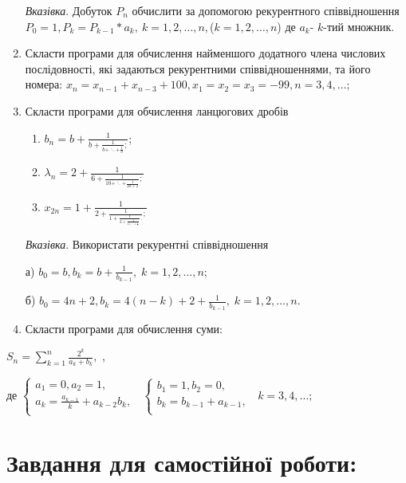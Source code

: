 \documentclass[a5paper,titlepage,openany,twoside,
]
{book_unv}%
\makeatletter
\newcommand{\xslalph}[1]{\expandafter\@xslalph\csname c@#1\endcsname}
\newcommand{\@xslalph}[1]{%
    \ifcase#1\or а\or б\or в\or г\or д\or e\or є\or ж\or з\or i%
    \or й\or к\or л\or м\or н\or о\or п\or р\or с\or т%
    \or у\or ф\or х\or ц\or ч\or ш\or ю\or я\or аа\or бб\or вв%
    \else\@ctrerr\fi%
}
\makeatother
\begin{document}
\begin{enumerate}
\emph{\emph{Вказівка}}. Добуток $P_{n}$ обчислити за
допомогою рекурентного співвідношення
\(P_{0} = 1,P_{k} = P_{k - 1}*a_{k},\ k = 1,2,\ldots,n,\)($k=1,2,\ldots,n$)
де \(a_{k}\)- $k$-тий множник.

\item
  Скласти програми для обчислення найменшого додатного члена числових
  послідовності, які задаються рекурентними співвідношеннями, та його
  номера:
\(x_{n} = x_{n - 1} + x_{n - 3} + 100, x_{1} = x_{2} = x_{3} = - 99, n = 3,4,\ldots;\)

\item
  Скласти програми для обчислення ланцюгових дробів
\begin{enumerate}[label=\xslalph*)]
\item \(b_{n} = b + \frac{1}{b + \frac{1}{b + \ddots + \frac{1}{b}};}\); 
\item
\(\lambda_{n} = 2 + \frac{1}{6 + \frac{1}{10 + \ddots + \frac{1}{4n + 2}};}\)
\item
\(x_{2n} = 1 + \frac{1}{2 + \frac{1}{1 + \frac{1}{2 + \frac{1}{1 + \ddots + \frac{1}{2}}}.};}\)
\end{enumerate}
\emph{\emph{Вказівка}}. Використати рекурентні співвідношення

а)
\(b_{0} = b,b_{k} = b + \frac{1}{b_{k - 1}}, \; k = 1,2,\ldots,n\);

б)
\(b_{0} = 4n + 2,b_{k} = 4(n - k) + 2 + \frac{1}{b_{k - 1}},\; k = 1,2,\ldots,n\).

\item
  Скласти програми для обчислення суми:
\end{enumerate}

\(S_{n} = \sum\limits_{k = 1}^{n}\frac{2^{k}}{a_{k} + b_{k}},\) ,

де \(\left\{ \begin{matrix}
 a_{1} = 0,a_{2} = 1, \\
 a_{k} = \frac{a_{k - 1}}{k} + a_{k - 2}b_{k}, \\
\end{matrix} \right.\ \) \(\left\{ \begin{matrix}
 b_{1} = 1,b_{2} = 0, \\
 b_{k} = b_{k - 1} + a_{k - 1}, \\
\end{matrix} \right.\ \) \(k = 3,4,\ldots;\)



\section{Завдання для самостійної роботи:}
\end{document}
